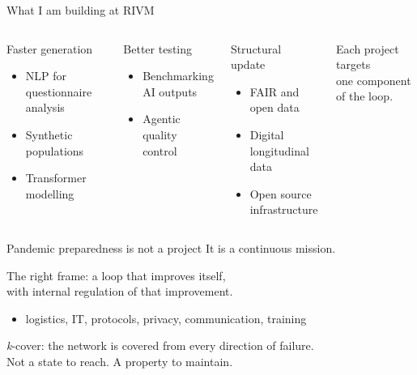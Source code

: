 \documentclass[aspectratio=169, 10pt]{beamer}
\begin{document}
\begin{frame}{What I am building at RIVM}
  \begin{columns}[T]
      \begin{block}{Faster generation}
        \begin{itemize}
          \item NLP for questionnaire analysis
          \item Synthetic populations
          \item Transformer modelling
        \end{itemize}
      \end{block}
      \begin{block}{Better testing}
        \begin{itemize}
          \item Benchmarking AI outputs
          \item Agentic quality control
        \end{itemize}
      \end{block}

      \begin{block}{Structural update}
        \begin{itemize}
          \item FAIR and open data
          \item Digital longitudinal data
          \item Open source infrastructure
        \end{itemize}
      \end{block}
      \begin{alertblock}{}
        Each project targets\\
        one component of the loop.
      \end{alertblock}
  \end{columns}
\end{frame}

\begin{frame}{Pandemic preparedness is not a project}
  It is a continuous mission.

  \bigskip
  The right frame: a loop that improves itself,\\
  with internal regulation of that improvement.

  \bigskip
  \begin{itemize}
    \item logistics, IT, protocols, privacy, communication, training
  \end{itemize}

  \bigskip
  \begin{alertblock}{}
    \centering
    \textit{k}-cover: the network is covered from every direction of failure.\\
    Not a state to reach. A property to maintain.
  \end{alertblock}
\end{frame}
\end{document}
